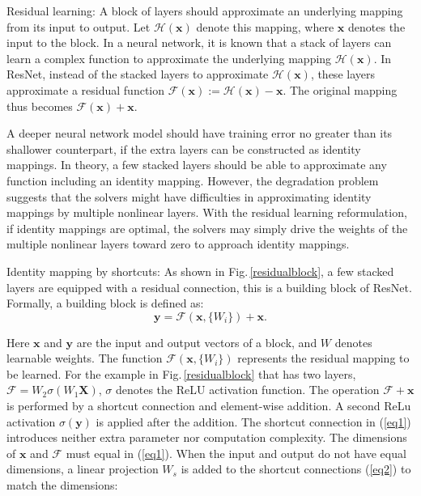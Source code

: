 Residual learning:
A block of layers should approximate an underlying mapping from its input to output. Let $\mathcal{H}(\mathbf{x})$ denote this mapping, where $\mathbf{x}$ denotes the input to the block. In a neural network, it is known that a stack of layers can learn a complex function to approximate the underlying mapping $\mathcal{H}(\mathbf{x})$. In ResNet, instead of the stacked layers to approximate $\mathcal{H}(\mathbf{x})$, these layers approximate a residual function $\mathcal{F}(\mathbf{x}) := \mathcal{H}(\mathbf{x})-\mathbf{x}$. The original mapping thus becomes $\mathcal{F}(\mathbf{x})+\mathbf{x}$. 

A deeper neural network model should have training error no greater than its shallower counterpart, if the extra layers can be constructed as identity mappings. In theory, a few stacked layers should be able to approximate any function including an identity mapping. However, the degradation problem suggests that the solvers might have difficulties in approximating identity mappings by multiple nonlinear layers. With the residual learning reformulation, if identity mappings are optimal, the solvers may simply drive the weights of the multiple nonlinear layers toward zero to approach identity mappings. 

Identity mapping by shortcuts: 
As shown in Fig.\,\ref{residualblock}, a few stacked layers are equipped with a residual connection, this is a building block of ResNet. Formally, a building block is defined as: 
\begin{equation} \label{eq1}
\mathbf{y} = \mathcal{F} (\mathbf{x}, \{W_i\}) + \mathbf{x}.
\end{equation}

Here $\mathbf{x}$ and $\mathbf{y}$ are the input and output vectors of a block, and $W$ denotes learnable weights. The function $\mathcal{F} (\mathbf{x}, \{W_i\})$ represents the residual mapping to be learned. For the example in Fig.\,\ref{residualblock} that has two layers, $\mathcal{F}=W_2\sigma(W_1\mathbf{X})$, $\sigma$ denotes the ReLU activation function. The operation $\mathcal{F} + \mathbf{x}$ is performed by a shortcut connection and element-wise addition. A second ReLu activation $\sigma(\mathbf{y})$ is applied after the addition. The shortcut connection in (\ref{eq1}) introduces neither extra parameter nor computation complexity. The dimensions of $\mathbf{x}$ and $\mathcal{F}$ must equal in (\ref{eq1}). When the input and output do not have equal dimensions, a linear projection $W_s$ is added to the shortcut connections (\ref{eq2}) to match the dimensions: 

